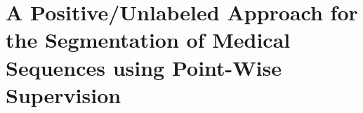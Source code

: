 \glsresetall

\chapter{A Positive/Unlabeled Approach for the
Segmentation of Medical Sequences using
Point-Wise Supervision}



% 





\begin{subappendices}

\end{subappendices}

